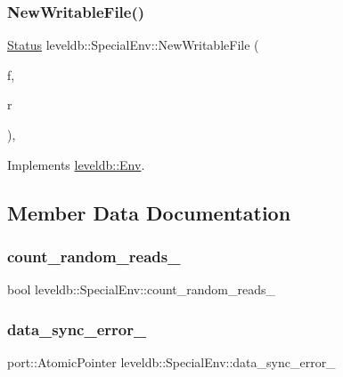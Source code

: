 \subsubsection{\texorpdfstring{NewWritableFile()}{NewWritableFile()}}
{\footnotesize\ttfamily \mbox{\hyperlink{classleveldb_1_1_status}{Status}} leveldb\+::\+Special\+Env\+::\+New\+Writable\+File (\begin{DoxyParamCaption}\item[{const std\+::string \&}]{f,  }\item[{\mbox{\hyperlink{classleveldb_1_1_writable_file}{Writable\+File}} $\ast$$\ast$}]{r }\end{DoxyParamCaption})\hspace{0.3cm}{\ttfamily [inline]}, {\ttfamily [virtual]}}



Implements \mbox{\hyperlink{classleveldb_1_1_env_a4566194f3e82fede425fdb5bb355f7de}{leveldb\+::\+Env}}.



\subsection{Member Data Documentation}
\mbox{\label{classleveldb_1_1_special_env_aaf50860248689bda9993dfdcfb53855a}} 
\subsubsection{\texorpdfstring{count\_random\_reads\_}{count\_random\_reads\_}}
{\footnotesize\ttfamily bool leveldb\+::\+Special\+Env\+::count\+\_\+random\+\_\+reads\+\_\+}

\mbox{\label{classleveldb_1_1_special_env_ae468cdabd36e0b9fde534bb25a47499f}} 
\subsubsection{\texorpdfstring{data\_sync\_error\_}{data\_sync\_error\_}}
{\footnotesize\ttfamily port\+::\+Atomic\+Pointer leveldb\+::\+Special\+Env\+::data\+\_\+sync\+\_\+error\+\_\+}

